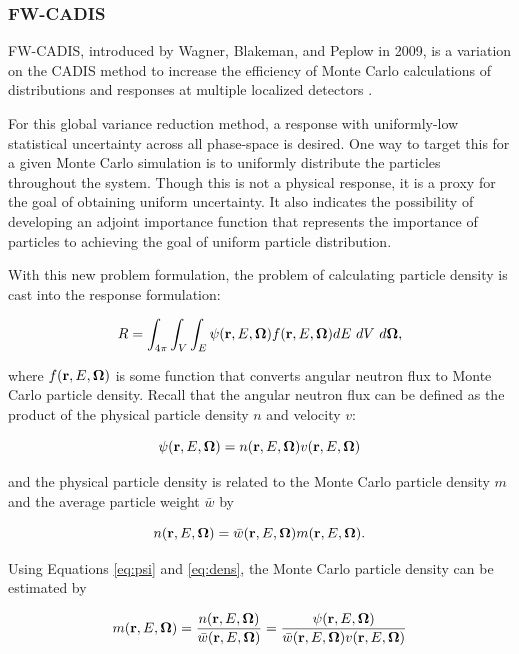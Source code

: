\subsubsection{FW-CADIS}
\label{sec:fwcadis}

FW-CADIS, introduced
by Wagner, Blakeman, and Peplow in 2009, is a variation on the CADIS method to 
increase the efficiency of Monte Carlo calculations of distributions and responses at 
multiple localized detectors \cite{fwcadis}.

For this global variance reduction method, a response with uniformly-low statistical 
uncertainty across all phase-space is desired. One way to target this for a given 
Monte Carlo simulation is to uniformly distribute the particles throughout the system.
Though this is not a physical response, it is a proxy for the goal of obtaining 
uniform uncertainty. It also indicates the possibility of developing an adjoint 
importance function that represents the importance of particles to achieving the goal
of uniform particle distribution.

With this new problem formulation, the problem of calculating particle density is cast
into the response formulation:

\begin{equation}
R = \int_{4\pi}\int_{V}\int_{E}\psi(\vecr,E,\bo)f(\vecr,E,\bo)dE\ dV\ d\bo,
\end{equation}

\noindent where $f(\textbf{r},E,\mathbf\Omega)$ is some function that converts angular neutron flux 
to Monte Carlo particle density. Recall that the angular neutron flux can be defined 
as the product of the physical particle density $n$ and velocity $v$:

\begin{equation}
\psi(\textbf{r},E,\mathbf\Omega) = n(\textbf{r},E,\mathbf\Omega)v(\textbf{r},E,\mathbf\Omega)
\label{eq:psi}
\end{equation}

\noindent and the physical particle density is related to the Monte Carlo particle 
density $m$ and the average particle weight $\bar{w}$ by

\begin{equation}
n(\textbf{r},E,\mathbf\Omega) = \bar{w}(\textbf{r},E,\mathbf\Omega)m(\textbf{r},E,\mathbf\Omega).
\label{eq:dens}
\end{equation}

\noindent Using Equations \ref{eq:psi} and \ref{eq:dens}, the Monte Carlo particle 
density can be estimated by

\begin{equation}
m(\textbf{r},E,\mathbf\Omega) = \frac{n(\textbf{r},E,\mathbf\Omega)}{\bar{w}(\textbf{r},E,\mathbf\Omega)} 
= \frac{\psi(\textbf{r},E,\mathbf\Omega)}{\bar{w}(\textbf{r},E,\mathbf\Omega)v(\textbf{r},E,\mathbf\Omega)}
\end{equation}

